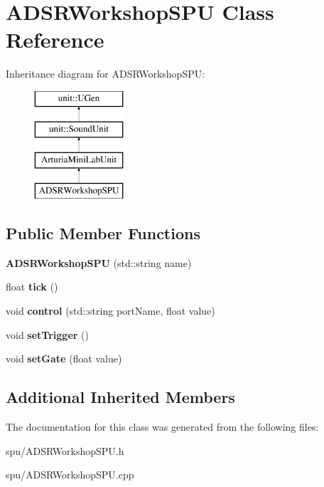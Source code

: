 \hypertarget{classADSRWorkshopSPU}{}\section{A\+D\+S\+R\+Workshop\+S\+PU Class Reference}
\label{classADSRWorkshopSPU}
Inheritance diagram for A\+D\+S\+R\+Workshop\+S\+PU\+:\begin{figure}[H]
\begin{center}
\leavevmode
\includegraphics[height=4.000000cm]{classADSRWorkshopSPU}
\end{center}
\end{figure}
\subsection*{Public Member Functions}
\begin{DoxyCompactItemize}
\item 
{\bfseries A\+D\+S\+R\+Workshop\+S\+PU} (std\+::string name)\hypertarget{classADSRWorkshopSPU_a2140f477c0bdc9fac9b66a6c103bb126}{}\label{classADSRWorkshopSPU_a2140f477c0bdc9fac9b66a6c103bb126}

\item 
float {\bfseries tick} ()\hypertarget{classADSRWorkshopSPU_a8ec50457bbb3455b797f87cdb9988164}{}\label{classADSRWorkshopSPU_a8ec50457bbb3455b797f87cdb9988164}

\item 
void {\bfseries control} (std\+::string port\+Name, float value)\hypertarget{classADSRWorkshopSPU_af50b5a155375a444b9ebfe154b643409}{}\label{classADSRWorkshopSPU_af50b5a155375a444b9ebfe154b643409}

\item 
void {\bfseries set\+Trigger} ()\hypertarget{classADSRWorkshopSPU_a961200f724c466c0dc0a0156dd01cbcc}{}\label{classADSRWorkshopSPU_a961200f724c466c0dc0a0156dd01cbcc}

\item 
void {\bfseries set\+Gate} (float value)\hypertarget{classADSRWorkshopSPU_a51be23dcf951c1e752c218bf3c0be9bd}{}\label{classADSRWorkshopSPU_a51be23dcf951c1e752c218bf3c0be9bd}

\end{DoxyCompactItemize}
\subsection*{Additional Inherited Members}


The documentation for this class was generated from the following files\+:\begin{DoxyCompactItemize}
\item 
spu/A\+D\+S\+R\+Workshop\+S\+P\+U.\+h\item 
spu/A\+D\+S\+R\+Workshop\+S\+P\+U.\+cpp\end{DoxyCompactItemize}

